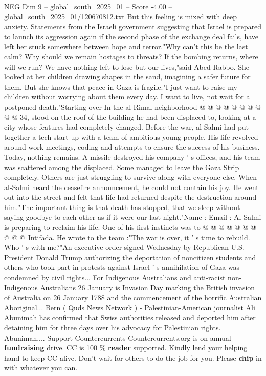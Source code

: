\begin{textsample}{NEG Dim 9 – global\_south\_2025\_01 – Score -4.00 – global\_south\_2025\_01/120670812.txt}
But this feeling is mixed with deep anxiety.
Statements from the Israeli government suggesting that Israel is prepared to launch its aggression again if the second phase of the exchange deal fails, have left her stuck somewhere between hope and terror."Why can't this be the last calm?
Why should we remain hostages to threats?
If the bombing returns, where will we run?
We have nothing left to lose but our lives,"said Abed Rabbo.
She looked at her children drawing shapes in the sand, imagining a safer future for them.
But she knows that peace in Gaza is fragile."I just want to raise my children without worrying about them every day.
I want to live, not wait for a postponed death."Starting over In the al-Rimal neighborhood @ @ @ @ @ @ @ @ @ @ 34, stood on the roof of the building he had been displaced to, looking at a city whose features had completely changed.
Before the war, al-Salmi had put together a tech start-up with a team of ambitious young people.
His life revolved around work meetings, coding and attempts to ensure the success of his business.
Today, nothing remains.
A missile destroyed his company ' s offices, and his team was scattered among the displaced.
Some managed to leave the Gaza Strip completely.
Others are just struggling to survive along with everyone else.
When al-Salmi heard the ceasefire announcement, he could not contain his joy.
He went out into the street and felt that life had returned despite the destruction around him."The important thing is that death has stopped, that we sleep without saying goodbye to each other as if it were our last night."Name : Email : Al-Salmi is preparing to reclaim his life.
One of his first instincts was to @ @ @ @ @ @ @ @ @ @ Intifada.
He wrote to the team :"The war is over, it ' s time to rebuild.
Who ' s with me?"An executive order signed Wednesday by Republican U.S.
President Donald Trump authorizing the deportation of noncitizen students and others who took part in protests against Israel ' s annihilation of Gaza was condemned by civil rights...
For Indigenous Australians and anti-racist non-Indigenous Australians 26 January is Invasion Day marking the British invasion of Australia on 26 January 1788 and the commencement of the horrific Australian Aboriginal...
Bern ( Quds News Network ) - Palestinian-American journalist Ali Abunimah has confirmed that Swiss authorities released and deported him after detaining him for three days over his advocacy for Palestinian rights.
Abunimah,...
Support Countercurrents Countercurrents.org is on annual \textbf{fundraising} drive.
CC is 100 \% \textbf{reader} supported.
Kindly lend your helping hand to keep CC alive.
Don't wait for others to do the job for you.
Please \textbf{chip} in with whatever you can.

\end{textsample}
